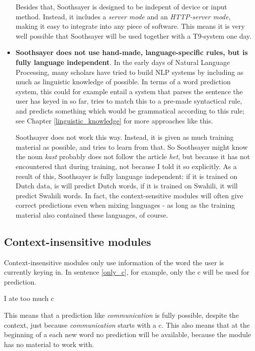 \documentclass[11pt]{article}
\begin{document}
\begin{itemize}
Besides that, Soothsayer is designed to be indepent of device or input method. Instead, it includes a \emph{server mode} and an \emph{HTTP-server mode}, making it easy to integrate into any piece of software. This means it is very well possible that Soothsayer will be used together with a T9-system one day.

\item \textbf{Soothsayer does not use hand-made, language-specific rules, but is fully language independent}. In the early days of Natural Language Processing, many scholars have tried to build NLP systems by including as much as linguistic knowledge of possible. In terms of a word prediction system, this could for example entail a system that parses the sentence the user has keyed in so far, tries to match this to a pre-made syntactical rule, and predicts something which would be grammatical according to this rule; see Chapter \ref{linguistic_knowledge} for more approaches like this.

Soothsayer does not work this way. Instead, it is given as much training material as possible, and tries to learn from that. So Soothsayer might know the noun \emph{kast} probably does not follow the article \emph{het}, but because it has not encountered that during training, not because I told it so explicitly. As a result of this, Soothsayer is fully language independent: if it is trained on Dutch data, is will predict Dutch words, if it is trained on Swahili, it will predict Swahili words. In fact, the context-sensitive modules will often give correct predictions even when mixing languages - as long as the training material also contained these languages, of course.

\end{itemize}

\subsection{Context-insensitive modules} \label{ci}

Context-insensitive modules only use information of the word the user is currently keying in. In sentence \ref{only_c}, for example, only the c will be used for prediction. 

\begin{examples}
\item I ate too much c \label{only_c}
\end{examples}

This means that a prediction like \emph{communication} is fully possible, despite the context, just because \emph{communication} starts with a c. This also means that at the beginning of a each new word no prediction will be available, because the module has no material to work with.
\end{document}
